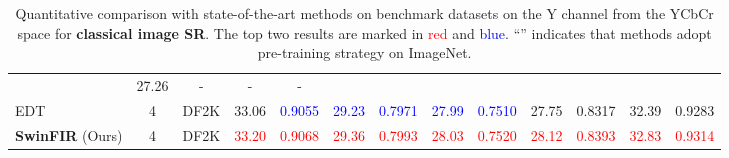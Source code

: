 \documentclass[10pt,twocolumn,letterpaper]{article}
\begin{document}
\begin{table*}[!t]
{\begin{tabular}{lcccccccccccc}
			& {27.26}
			& {-}
			& {-}
			& {-}
			\\
			EDT & 4 & DF2K & 33.06
			& \textcolor{blue}{0.9055}
			& \textcolor{blue}{29.23}
			& \textcolor{blue}{0.7971}
			& \textcolor{blue}{27.99}
			& \textcolor{blue}{0.7510}
			& 27.75
			& 0.8317
			& 32.39
			& 0.9283
			\\
			\textbf{SwinFIR} (Ours) & 4 & DF2K & \textcolor{red}{33.20}
			& \textcolor{red}{0.9068}
			& \textcolor{red}{29.36}
			& \textcolor{red}{0.7993}
			& \textcolor{red}{28.03}
			& \textcolor{red}{0.7520}
			& \textcolor{red}{28.12}
			& \textcolor{red}{0.8393}
			& \textcolor{red}{32.83}
			& \textcolor{red}{0.9314}
			\\
			\hline             
		\end{tabular}}
\caption{Quantitative comparison with state-of-the-art methods on benchmark datasets on the Y channel from the YCbCr space for \textbf{classical image SR}. The top two results are marked in \textcolor{red}{red} and \textcolor{blue}{blue}. ``'' indicates that methods adopt pre-training strategy on ImageNet.}
		\label{tab:SwinFIR_quantitative_results}
\end{table*}

 
\end{document}
